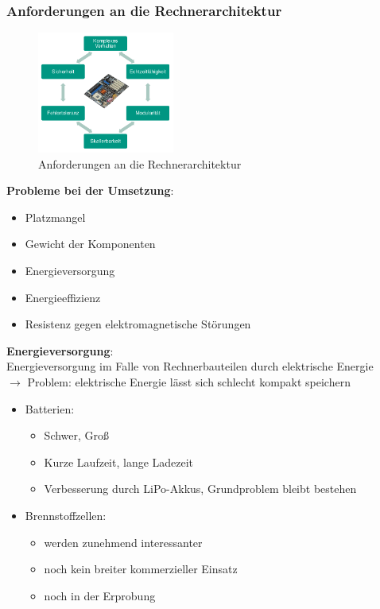 \subsubsection{Anforderungen an die Rechnerarchitektur}
\begin{figure}[h!]
	\centering
	\includegraphics[width=0.4\textwidth]{figures/ch07_arch.png}
	\caption{Anforderungen an die Rechnerarchitektur}
	\label{arch}
\end{figure}
\textbf{Probleme bei der Umsetzung}:
\begin{itemize}
\item Platzmangel
\item Gewicht der Komponenten
\item Energieversorgung
\item Energieeffizienz
\item Resistenz gegen elektromagnetische Störungen
\end{itemize}
\textbf{Energieversorgung}:\\
Energieversorgung im Falle von Rechnerbauteilen durch elektrische Energie\\
$\rightarrow$ Problem: elektrische Energie lässt sich schlecht kompakt speichern
\begin{itemize}
\item Batterien:
\begin{itemize}
\item  Schwer, Groß
\item Kurze Laufzeit, lange Ladezeit
\item Verbesserung durch LiPo-Akkus, Grundproblem bleibt bestehen
\end{itemize}
\item Brennstoffzellen:
\begin{itemize}
\item werden zunehmend interessanter
\item noch kein breiter kommerzieller Einsatz
\item noch in der Erprobung
\end{itemize}
\end{itemize}
